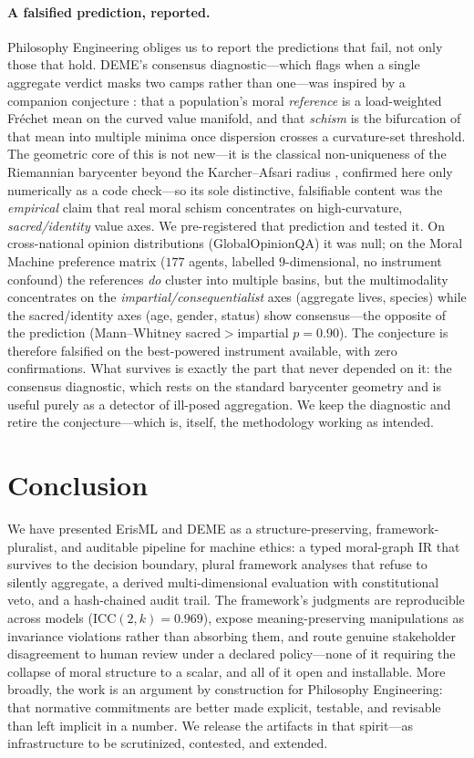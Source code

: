 \paragraph{A falsified prediction, reported.} Philosophy Engineering obliges us to report the
predictions that fail, not only those that hold. DEME's consensus diagnostic---which flags when a
single aggregate verdict masks two camps rather than one---was inspired by a companion conjecture
\cite{bond_ert}: that a population's moral \emph{reference} is a load-weighted Fr\'echet mean on the
curved value manifold, and that \emph{schism} is the bifurcation of that mean into multiple minima
once dispersion crosses a curvature-set threshold. The geometric core of this is not new---it is the
classical non-uniqueness of the Riemannian barycenter beyond the Karcher--Afsari radius
\cite{karcher1977,afsari2011}, confirmed here only numerically as a code check---so its sole
distinctive, falsifiable content was the \emph{empirical} claim that real moral schism concentrates
on high-curvature, \emph{sacred/identity} value axes. We pre-registered that prediction and tested it.
On cross-national opinion distributions (GlobalOpinionQA) it was null; on the Moral Machine preference
matrix ($177$ agents, labelled $9$-dimensional, no instrument confound) the references \emph{do}
cluster into multiple basins, but the multimodality concentrates on the \emph{impartial/consequentialist}
axes (aggregate lives, species) while the sacred/identity axes (age, gender, status) show
consensus---the opposite of the prediction (Mann--Whitney sacred${>}$impartial $p{=}0.90$). The
conjecture is therefore falsified on the best-powered instrument available, with zero confirmations.
What survives is exactly the part that never depended on it: the consensus diagnostic, which rests on
the standard barycenter geometry and is useful purely as a detector of ill-posed aggregation. We keep
the diagnostic and retire the conjecture---which is, itself, the methodology working as intended.

\section{Conclusion}
\label{sec:conc}
We have presented ErisML and DEME as a structure-preserving, framework-pluralist, and auditable
pipeline for machine ethics: a typed moral-graph IR that survives to the decision boundary,
plural framework analyses that refuse to silently aggregate, a derived multi-dimensional
evaluation with constitutional veto, and a hash-chained audit trail. The framework's judgments
are reproducible across models (ICC$(2,k)=0.969$), expose meaning-preserving manipulations as
invariance violations rather than absorbing them, and route genuine stakeholder disagreement to
human review under a declared policy---none of it requiring the collapse of moral structure to a
scalar, and all of it open and installable. More broadly, the work is an argument by
construction for Philosophy Engineering: that normative commitments are better made explicit,
testable, and revisable than left implicit in a number. We release the artifacts in that
spirit---as infrastructure to be scrutinized, contested, and extended.

